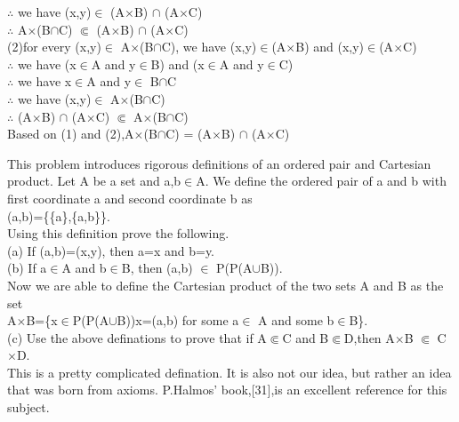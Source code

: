 \documentclass[11pt, a4paper, UTF8]{ctexart}
\begin{document}
\begin{solution}
$\therefore$ we have (x,y)$\in$ (A$\times$B) $\cap$ (A$\times$C)\\
$\therefore$  A$\times$(B$\cap$C) $\Subset$ (A$\times$B) $\cap$ (A$\times$C)\\
(2)for every (x,y)$\in$ A$\times$(B$\cap$C), we have (x,y)$\in$(A$\times$B) and (x,y)$\in$(A$\times$C)\\
$\therefore$ we have (x$\in$A and y$\in$B) and (x$\in$A and y$\in$C)\\
$\therefore$ we have x$\in$A and y$\in$ B$\cap$C\\
$\therefore$ we have (x,y)$\in$ A$\times$(B$\cap$C)\\
$\therefore$ (A$\times$B) $\cap$ (A$\times$C) $\Subset$ A$\times$(B$\cap$C)\\
Based on (1) and (2),A$\times$(B$\cap$C) = (A$\times$B) $\cap$ (A$\times$C)\\
\end{solution}






\begin{problem}[UD:9.16]
This problem introduces rigorous definitions of an ordered pair and Cartesian product. Let A be a set and a,b$\in$A. We define the ordered pair of a and b with first coordinate a and second coordinate b as\\
\indent \indent (a,b)=\{\{a\},\{a,b\}\}.\\
Using this definition prove the following.\\
(a) If (a,b)=(x,y), then a=x and b=y.\\
(b) If a$\in$A and b$\in$B, then (a,b) $\in$ P(P(A$\cup$B)).\\
Now we are able to define the Cartesian product of the two sets A and B as the set\\
A$\times$B=\{x$\in$P(P(A$\cup$B))\:x=(a,b) for some a$\in$ A and some b$\in$B\}.\\
(c) Use the above definations to prove that if A$\Subset$C and B$\Subset$D,then A$\times$B $\Subset$ C$\times$D.\\
\indent This is a pretty complicated defination. It is also not our idea, but rather an idea that was born from axioms. P.Halmos' book,[31],is an excellent reference for this subject.

\end{problem}
\end{document}
